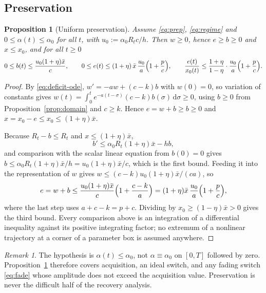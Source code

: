 \documentclass[11pt]{article}
\newtheorem{proposition}[theorem]{Proposition}
\theoremstyle{definition}
\theoremstyle{remark}
\newtheorem{remark}[theorem]{Remark}
\newcommand{\xb}{\bar{x}}
\newcommand{\dd}{\,\mathrm{d}}
\begin{document}
\subsection{Preservation}

\begin{proposition}[Uniform preservation]\label{prop:pres}
Assume \eqref{eq:prep}, \eqref{eq:regime} and $0\le\alpha(t)\le\alpha_0$ for all
$t$, with $u_0:=\alpha_0R_tc/h$. Then $w\ge0$, hence $e\ge b\ge0$ and
$x\le x_0$, and for all $t\ge0$
\begin{equation}
0\le b(t)\le\frac{u_0(1+\eta)\xb}{c},
\qquad
0\le e(t)\le(1+\eta)\,\xb\,\frac{u_0}{a}\Bigl(1+\frac pc\Bigr),
\qquad
\frac{e(t)}{x_0(t)}\le\frac{1+\eta}{1-\eta}\cdot\frac{u_0}{a}\Bigl(1+\frac pc\Bigr).
\label{eq:pres}
\end{equation}
\end{proposition}

\begin{proof}
By \eqref{eq:deficit-ode}, $w'=-aw+(c-k)b$ with $w(0)=0$, so variation of
constants gives $w(t)=\int_0^te^{-a(t-\sigma)}(c-k)b(\sigma)\dd\sigma\ge0$,
using $b\ge0$ from Proposition~\ref{prop:domain} and $c\ge k$. Hence
$e=w+b\ge b\ge0$ and $x=x_0-e\le x_0\le(1+\eta)\xb$.

Because $R_t-b\le R_t$ and $x\le(1+\eta)\xb$,
\[
b'\le\alpha_0R_t(1+\eta)\xb-hb ,
\]
and comparison with the scalar linear equation from $b(0)=0$ gives
$b\le\alpha_0R_t(1+\eta)\xb/h=u_0(1+\eta)\xb/c$, which is the first bound.
Feeding it into the representation of $w$ gives
$w\le(c-k)u_0(1+\eta)\xb/(ca)$, so
\[
e=w+b\le\frac{u_0(1+\eta)\xb}{c}\Bigl(1+\frac{c-k}{a}\Bigr)
=(1+\eta)\xb\,\frac{u_0}{a}\Bigl(1+\frac{p}{c}\Bigr),
\]
where the last step uses $a+c-k=p+c$. Dividing by $x_0\ge(1-\eta)\xb>0$ gives
the third bound. Every comparison above is an integration of a differential
inequality against its positive integrating factor; no extremum of a nonlinear
trajectory at a corner of a parameter box is assumed anywhere.
\end{proof}

\begin{remark}
The hypothesis is $\alpha(t)\le\alpha_0$, not $\alpha\equiv\alpha_0$ on $[0,T]$
followed by zero. Proposition~\ref{prop:pres} therefore covers acquisition, an
ideal switch, and any fading switch \eqref{eq:fade} whose amplitude does not
exceed the acquisition value. Preservation is never the difficult half of the
recovery analysis.
\end{remark}
\end{document}
